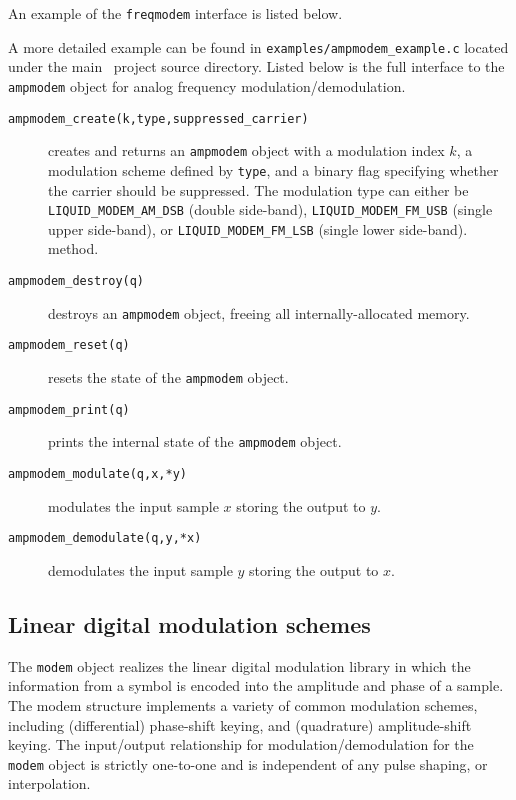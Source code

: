An example of the {\tt freqmodem} interface is listed below.
%

%
A more detailed example can be found in
{\tt examples/ampmodem\_example.c}
located under the main \liquid\ project source directory.
Listed below is the full interface to the {\tt ampmodem} object for
analog frequency modulation/demodulation.
%
\begin{description}
\item[{\tt ampmodem\_create(k,type,suppressed\_carrier)}]
    creates and returns an {\tt ampmodem} object with a modulation
    index $k$,
    a modulation scheme defined by {\tt type},
    and a binary flag specifying whether the carrier should be
    suppressed.
    The modulation type can either be
    {\tt LIQUID\_MODEM\_AM\_DSB} (double side-band),
    {\tt LIQUID\_MODEM\_FM\_USB} (single upper side-band), or
    {\tt LIQUID\_MODEM\_FM\_LSB} (single lower side-band).
    method.
\item[{\tt ampmodem\_destroy(q)}]
    destroys an {\tt ampmodem} object, freeing all internally-allocated
    memory.
\item[{\tt ampmodem\_reset(q)}]
    resets the state of the {\tt ampmodem} object.
\item[{\tt ampmodem\_print(q)}]
    prints the internal state of the {\tt ampmodem} object.
\item[{\tt ampmodem\_modulate(q,x,*y)}]
    modulates the input sample $x$ storing the output to $y$.
\item[{\tt ampmodem\_demodulate(q,y,*x)}]
    demodulates the input sample $y$ storing the output to $x$.
\end{description}





%
%

\subsection{Linear digital modulation schemes}
\label{module:modem:digital}
The {\tt modem} object realizes the linear digital modulation library in which
the information from a symbol is encoded into the amplitude and phase of a
sample.
The modem structure implements a variety of common modulation schemes,
including (differential) phase-shift keying, and (quadrature) amplitude-shift
keying.
The input/output relationship for modulation/demodulation for the {\tt modem}
object is
strictly one-to-one and is independent of any pulse shaping, or interpolation.

